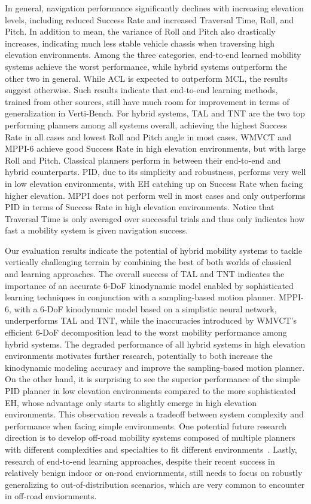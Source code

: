 In general, navigation performance significantly declines with increasing elevation levels, including reduced Success Rate and increased Traversal Time, Roll, and Pitch. In addition to mean, the variance of Roll and Pitch also drastically increases, indicating much less stable vehicle chassis when traversing high elevation environments. Among the three categories, end-to-end learned mobility systems achieve the worst performance, while hybrid systems outperform the other two in general. While ACL is expected to outperform MCL, the results suggest otherwise. Such results indicate that end-to-end learning methods, trained from other sources, still have much room for improvement in terms of generalization in Verti-Bench. For hybrid systems, TAL and TNT are the two top performing planners among all systems overall, achieving the highest Success Rate in all cases and lowest Roll and Pitch angle in most cases. WMVCT and MPPI-6 achieve good Success Rate in high elevation environments, but with large Roll and Pitch. Classical planners perform in between their end-to-end and hybrid counterparts. PID, due to its simplicity and robustness, performs very well in low elevation environments, with EH catching up on Success Rate when facing higher elevation.  MPPI does not perform well in most cases and only outperforms PID in terms of Success Rate in high elevation environments. 
Notice that Traversal Time is only averaged over successful trials and thus only indicates how fast a mobility system is given navigation success. 

Our evaluation results indicate the potential of hybrid mobility systems to tackle vertically challenging terrain by combining the best of both worlds of classical and learning approaches. The overall success of TAL and TNT indicates the importance of an accurate 6-DoF kinodynamic model enabled by sophisticated learning techniques in conjunction with a sampling-based motion planner. MPPI-6, with a 6-DoF kinodynamic model based on a simplistic neural network, underperforms TAL and TNT, while the inaccuracies introduced by WMVCT's efficient 6-DoF decomposition lead to the worst mobility performance among hybrid systems. The degraded performance of all hybrid systems in high elevation environments motivates further research, potentially to both increase the kinodynamic modeling accuracy and improve the sampling-based motion planner. On the other hand, it is surprising to see the superior performance of the simple PID planner in low elevation environments compared to the more sophisticated EH, whose advantage only starts to slightly emerge in high elevation environments. This observation reveals a tradeoff between system complexity and performance when facing simple environments. One potential future research direction is to develop off-road mobility systems composed of multiple planners with different complexities and specialties to fit different environments~\cite{choudhury2015planner}. Lastly, research of end-to-end learning approaches, despite their recent success in relatively benign indoor or on-road enviornments, still needs to focus on robustly generalizing to out-of-distribution scenarios, which are very common to encounter in off-road enviornments. 



